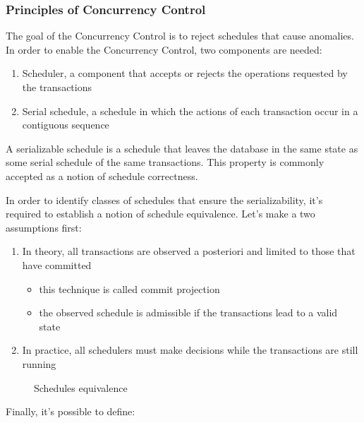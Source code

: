 \documentclass[english]{article}
\begin{document}
\subsubsection{Principles of Concurrency Control}

The goal of the Concurrency Control is to reject schedules that cause anomalies.
In order to enable the Concurrency Control, two components are needed:

\begin{enumerate}
  \item Scheduler, a component that accepts or rejects the operations requested by the transactions
  \item Serial schedule, a schedule in which the actions of each transaction occur in a contiguous sequence
\end{enumerate}

\bigskip
A serializable schedule is a schedule that leaves the database in the same state as some serial schedule of the same transactions.
This property is commonly accepted as a notion of schedule correctness.

In order to identify classes of schedules that ensure the serializability, it's required to establish a notion of schedule equivalence.
Let's make a two assumptions first:

\begin{enumerate}
  \item In theory, all transactions are observed a posteriori and limited to those that have committed
        \begin{itemize}
          \item this technique is called commit projection
          \item the observed schedule is admissible if the transactions lead to a valid state
        \end{itemize}
  \item In practice, all schedulers must make decisions while the transactions are still running
\end{enumerate}

\begin{figure}
  \bigskip
  \centering
  \caption{Schedules equivalence}
  \label{fig:schedules-equivalence}
  \bigskip
\end{figure}

Finally, it's possible to define:
\end{document}
